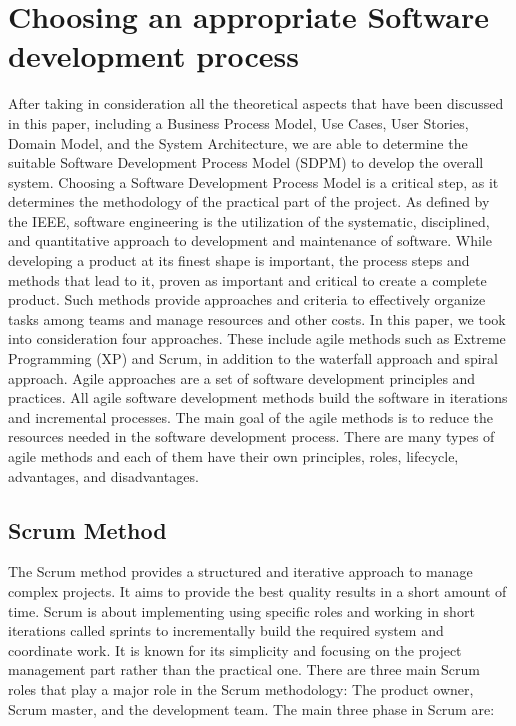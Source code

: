\documentclass[conference,onecolumn]{IEEEtran}
\begin{document}
\section{Choosing an appropriate Software development process}

	After taking in consideration all the theoretical aspects that have been discussed in this paper, including a Business Process Model, Use Cases, User Stories, Domain Model, and the System Architecture, we are able to determine the suitable Software Development Process Model (SDPM) to develop the overall system. Choosing a Software Development Process Model is a critical step, as it determines the methodology of the practical part of the project.
As defined by the IEEE, software engineering is the utilization of the systematic, disciplined, and quantitative approach to development and maintenance of software. While developing a product at its finest shape is important, the process steps and methods that lead to it, proven as important and critical to create a complete product. Such methods provide approaches and criteria to effectively organize tasks among teams and manage resources and other costs.  In this paper, we took into consideration four approaches. These include agile methods such as Extreme Programming (XP) and Scrum, in addition to the waterfall approach and spiral approach.
Agile approaches are a set of software development principles and practices. All agile software development methods build the software in iterations and incremental processes. The main goal of the agile methods is to reduce the resources needed in the software development process. There are many types of agile methods and each of them have their own principles, roles, lifecycle, advantages, and disadvantages.


	\subsection{Scrum Method}
	The Scrum method provides a structured and iterative approach to manage complex projects. It aims to provide the best quality results in a short amount of time. Scrum is about implementing using specific roles and working in short iterations called sprints to incrementally build the required system and coordinate work. It is known for its simplicity and focusing on the project management part rather than the practical one. There are three main Scrum roles that play a major role in the Scrum methodology: The product owner, Scrum master, and the development team.
	The main three phase in Scrum are:
\end{document}
